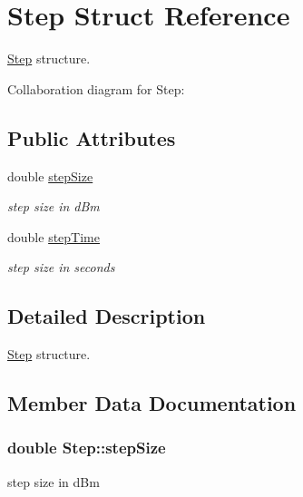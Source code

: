 \hypertarget{structStep}{}\section{Step Struct Reference}
\label{structStep}


\hyperlink{structStep}{Step} structure.  




Collaboration diagram for Step\+:
\subsection*{Public Attributes}
\begin{DoxyCompactItemize}
\item 
double \hyperlink{structStep_a54f255b32f86ab9fced0a0002dcb9420}{step\+Size}
\begin{DoxyCompactList}\small\item\em step size in d\+Bm \end{DoxyCompactList}\item 
double \hyperlink{structStep_a9d7cdfbd213343951d23c3c4c61604bd}{step\+Time}
\begin{DoxyCompactList}\small\item\em step size in seconds \end{DoxyCompactList}\end{DoxyCompactItemize}


\subsection{Detailed Description}
\hyperlink{structStep}{Step} structure. 

\subsection{Member Data Documentation}
\subsubsection[{\texorpdfstring{step\+Size}{stepSize}}]{\setlength{\rightskip}{0pt plus 5cm}double Step\+::step\+Size}\hypertarget{structStep_a54f255b32f86ab9fced0a0002dcb9420}{}\label{structStep_a54f255b32f86ab9fced0a0002dcb9420}


step size in d\+Bm 

